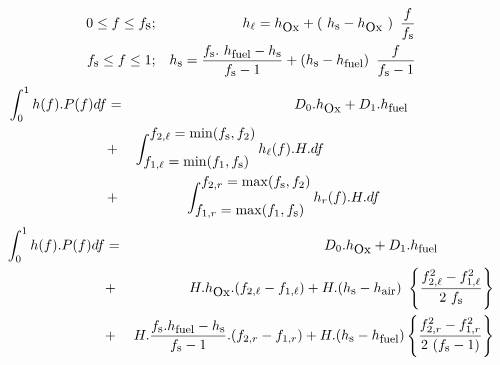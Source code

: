 \begin{eqnarray}
\displaystyle 0  \le f \le f_{\mbox{s}} &;& h_{\ell} = h_{\mbox{\small Ox}} + \left(~h_{\mbox{\footnotesize s}} - h_{\mbox{\small Ox}}~\right)~\frac{f}{f_{\mbox{\footnotesize s}}} \nonumber\\
\displaystyle f_{\mbox{\footnotesize s}} \le f \le 1  &;& h_{\mbox{\footnotesize s}} = \frac{f_{\mbox{\footnotesize s}}.~h_{\mbox{\footnotesize fuel}} - h_{\mbox{\footnotesize s}} }{f_{\mbox{\footnotesize s}}-1} + \left( h_{\mbox{\footnotesize s}}-h_{\mbox{\footnotesize fuel}} \right)~\frac{f}{f_{\mbox{\footnotesize s}}-1}
\end{eqnarray}\vspace{-0.22in}
\begin{eqnarray}
\displaystyle\int_{0}^1 h(f) . P(f) df &=& D_0.h_{\mbox{\small Ox}} + D_1.h_{\mbox{\footnotesize fuel}} \qquad\qquad\qquad\nonumber \\
                          &+& \int_{\displaystyle f_{1,\ell} = \min(f_1,f_{\mbox{\footnotesize s}})}^{\displaystyle f_{2,\ell} = \min(f_{\mbox{\footnotesize s}},f_2)} h_{\ell}(f) . H . df \qquad\qquad\qquad\qquad\qquad\qquad\label{Eqs_00B} \\
\displaystyle                          &+& \int_{\textstyle f_{1,r} = \max(f_1,f_{\mbox{\footnotesize s}})}^{\textstyle f_{2,r} = \max(f_{\mbox{\footnotesize s}},f_2)} h_{r}(f) . H . df \qquad\qquad\qquad\qquad\nonumber
\end{eqnarray}
\vspace{-0.22in}
\begin{eqnarray}
\int_{0}^1 h(f) . P(f) df &=& D_0.h_{\mbox{\small Ox}} + D_1.h_{\mbox{\footnotesize fuel}} \qquad \qquad\nonumber \\
                          &+& H. h_{\mbox{\small Ox}} . (f_{2,\ell}-f_{1,\ell}) 
                           +  H.(h_{\mbox{\footnotesize s}}-h_{\mbox{\footnotesize air}})~ 
\left\{ \frac{f_{2,\ell}^2-f_{1,\ell}^2}{2~f_{\mbox{\footnotesize s}}} \right\}\label{Eqs_00C} \\
                          &+& H . \frac{f_{\mbox{\footnotesize s}}.h_{\mbox{\footnotesize fuel}}-h_{\mbox{\footnotesize s}}}{f_{\mbox{\footnotesize s}}-1} . (f_{2,r}-f_{1,r}) + H. (h_{\mbox{\footnotesize s}}-h_{\mbox{\footnotesize fuel}})
\displaystyle \left\{ \displaystyle \frac{f_{2,r}^2-f_{1,r}^2}{2~(f_{\mbox{\footnotesize s}}-1)} \right\}\nonumber
\end{eqnarray}

